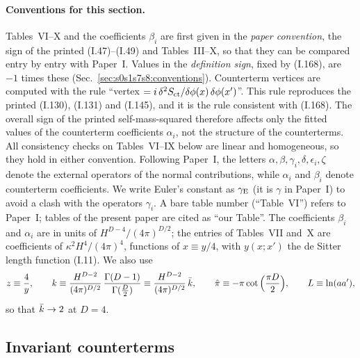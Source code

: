 \documentclass[aps,prd,onecolumn,10pt,nofootinbib,floatfix]{revtex4-2}
\newcommand{\PI}{Paper~I}
\newcommand{\eqI}[1]{(I.#1)}
\newcommand{\pihat}{\hat\pi}
\begin{document}
\paragraph*{Conventions for this section.}
Tables~VI--X and the coefficients $\beta_i$ are first given in the \emph{paper convention}, the sign of the printed \eqI{47}--\eqI{49} and Tables~III--X, so that they can be compared entry by entry with \PI.
Values in the \emph{definition sign}, fixed by \eqI{168}, are $-1$ times these (Sec.~\ref{sec:s0s1s7s8:conventions}).
Counterterm vertices are computed with the rule ``vertex $=i\,\delta^2S_{\rm ct}/\delta\phi(x)\,\delta\phi(x')$''.
This rule reproduces the printed \eqI{130}, \eqI{131} and \eqI{145}, and it is the rule consistent with \eqI{168}.
The overall sign of the printed self-mass-squared therefore affects only the fitted values of the counterterm coefficients $\alpha_i$, not the structure of the counterterms.
All consistency checks on Tables~VI--IX below are linear and homogeneous, so they hold in either convention.
Following \PI, the letters $\alpha,\beta,\gamma_i,\delta,\epsilon_i,\zeta$ denote the external operators of the normal contributions, while $\alpha_i$ and $\beta_i$ denote counterterm coefficients.
We write Euler's constant as $\gamma_{\rm E}$ (it is $\gamma$ in \PI) to avoid a clash with the operators $\gamma_i$.
A bare table number (``Table~VI'') refers to \PI; tables of the present paper are cited as ``our Table''.
The coefficients $\beta_i$ and $\alpha_i$ are in units of $H^{D-4}/(4\pi)^{D/2}$; the entries of Tables~VII and~X are coefficients of $\kappa^2H^4/(4\pi)^4$, functions of $x\equiv y/4$, with $y(x;x')$ the de Sitter length function \eqI{11}.
We also use
\begin{equation}
z\equiv\frac4y,\qquad
k\equiv\frac{H^{D-2}}{(4\pi)^{D/2}}\,\frac{\Gamma(D-1)}{\Gamma(\frac D2)}\equiv\frac{H^{D-2}}{(4\pi)^{D/2}}\,\sfivekb,\qquad
\pihat\equiv-\pi\cot\Big(\frac{\pi D}{2}\Big),\qquad
L\equiv\ln(aa') ,
\label{eq:s5:notation}
\end{equation}
so that $\bar k\to2$ at $D=4$.

\subsection{Invariant counterterms}
\label{sec:s5:inv}
\end{document}
